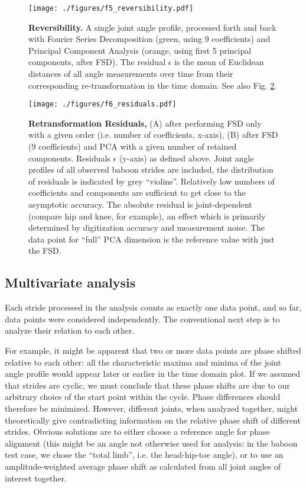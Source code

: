 \begin{figure}[pt]
\centering
\texttt{[image: ./figures/f5\_reversibility.pdf]}
\caption{\label{fig:reversibility}\textbf{Reversibility.} A single joint angle profile, processed forth and back with Fourier Series Decomposition (green, using 9 coefficients) and Principal Component Analysis (orange, using first 5 principal components, after FSD). The residual \(\epsilon\) is the mean of Euclidean distances of all angle measurements over time from their corresponding re-transformation in the time domain. See also Fig. \ref{fig:residuals}.}
\end{figure}

\begin{figure}[pt]
\centering
\texttt{[image: ./figures/f6\_residuals.pdf]}
\caption{\label{fig:residuals}\textbf{Retransformation Residuals,} (A) after performing FSD only with a given order (i.e. number of coefficients, x-axis), (B) after FSD (9 coefficients) and PCA with a given number of retained components. Residuals \(\epsilon\) (y-axis) as defined above. Joint angle profiles of all observed baboon strides are included, the distribution of residuals is indicated by grey ``violins''. Relatively low numbers of coefficients and components are sufficient to get close to the asymptotic accuracy. The absolute residual is joint-dependent (compare hip and knee, for example), an effect which is primarily determined by digitization accuracy and measurement noise. The data point for ``full'' PCA dimension is the reference value with just the FSD.}
\end{figure}

\subsection{Multivariate analysis}
\label{sec:org10a29bf}
Each stride processed in the analysis counts as exactly one data point, and so far, data points were considered independently.
The conventional next step is to analyze their relation to each other.

For example, it might be apparent that two or more data points are phase shifted relative to each other: all the characteristic maxima and minima of the joint angle profile would appear later or earlier in the time domain plot.
If we assumed that strides are cyclic, we must conclude that these phase shifts are due to our arbitrary choice of the start point within the cycle.
Phase differences should therefore be minimized.
However, different joints, when analyzed together, might theoretically give contradicting information on the relative phase shift of different strides.
Obvious solutions are to either choose a reference angle for phase alignment (this might be an angle not otherwise used for analysis: in the baboon test case, we chose the ``total limb'', i.e. the head-hip-toe angle), or to use an amplitude-weighted average phase shift as calculated from all joint angles of interest together.

